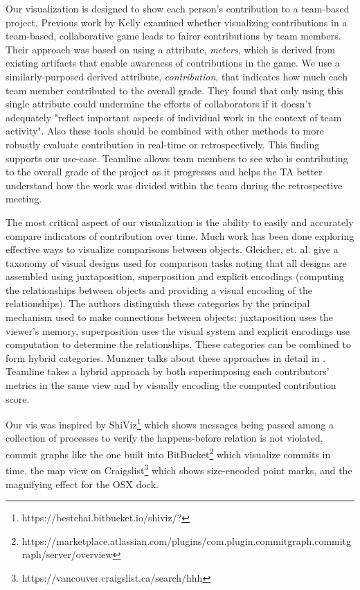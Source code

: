 \documentclass[../manifest.tex]{subfiles}
\begin{document}
Our visualization is designed to show each person's contribution to a team-based project. Previous work by Kelly \cite{Kelly:2016} examined whether visualizing contributions in a team-based, collaborative game leads to fairer contributions by team members. Their approach was based on using a attribute, \textit{meters}, which is derived from existing artifacts that enable awareness of contributions in the game. We use a similarly-purposed derived attribute, \textit{contribution}, that indicates how much each team member contributed to the overall grade. They found that only using this single attribute could undermine the efforts of collaborators if it doesn't adequately "reflect important aspects of individual work in the context of team activity". Also these tools should be combined with other methods to more robustly evaluate contribution in real-time or retrospectively. This finding supports our use-case. Teamline allows team members to see who is contributing to the overall grade of the project as it progresses and helps the TA better understand how the work was divided within the team during the retrospective meeting.

The most critical aspect of our visualization is the ability to easily and accurately compare indicators of contribution over time. Much work has been done exploring effective ways to visualize comparisons between objects. Gleicher, et. al.\cite{Gleicher:2011} give a taxonomy of visual designs used for comparison tasks noting that all designs are assembled using juxtaposition, superposition and explicit encodings (computing the relationships between objects and providing a visual encoding of the relationships). The authors distinguish these categories by the principal mechanism used to make connections between objects: juxtaposition uses the viewer’s memory, superposition uses the visual system and explicit encodings use computation to determine the relationships. These categories can be combined to form hybrid categories. Munzner talks about these approaches in detail in \cite{Munzner:2014}. Teamline takes a hybrid approach by both superimposing each contributors' metrics in the same view and by visually encoding the computed contribution score.

Our vis was inspired by ShiViz\footnote{https://bestchai.bitbucket.io/shiviz/?}\cite{Abrahamson:2014} which shows messages being passed among a collection of processes to verify the happens-before relation is not violated, commit graphs like the one built into BitBucket\footnote{https://marketplace.atlassian.com/plugins/com.plugin.commitgraph.commitgraph/server/overview} which visualize commits in time, the map view on Craigslist\footnote{https://vancouver.craigslist.ca/search/hhh} which shows size-encoded point marks, and the magnifying effect for the OSX dock.
\end{document}
